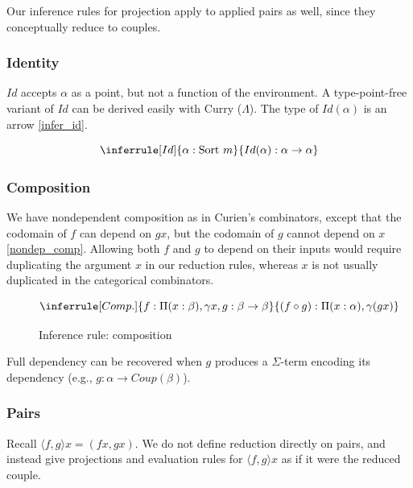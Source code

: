 \documentclass{article}
\newcommand{\sort}[1]{\text{Sort}\ #1}
\begin{document}
Our inference rules for projection apply to applied pairs as well, since they conceptually reduce to couples.

\subsubsection{Identity}

\(Id\) accepts \(\alpha\) as a point, but not a function of the environment. A type-point-free variant of \(Id\) can be derived easily with Curry (\(\Lambda\)). The type of \(Id(\alpha)\) is an arrow \eqref{infer_id}.

\begin{equation}\label{infer_id}
  \inferrule[Id]
  {\alpha : \sort{m}}
  {Id(\alpha) : \alpha \rightarrow \alpha}
\end{equation}

\subsubsection{Composition}

We have nondependent composition as in Curien's combinators, except that the codomain of \(f\) can depend on \(g x\), but the codomain of \(g\) cannot depend on \(x\) \eqref{nondep_comp}. Allowing both \(f\) and \(g\) to depend on their inputs would require duplicating the argument \(x\) in our reduction rules, whereas \(x\) is not usually duplicated in the categorical combinators.

\begin{figure}[h!]
  \centering
  \begin{equation}\label{nondep_comp}
    \inferrule[Comp.]
    { f : \Pi (x : \beta), \gamma x, g : \beta \rightarrow \beta}
    { (f \circ g) : \Pi (x : \alpha), \gamma (g x)}
  \end{equation}
  \caption{Inference rule: composition}
\end{figure}

Full dependency can be recovered when \(g\) produces a \(\Sigma\)-term encoding its dependency (e.g., \(g : \alpha \rightarrow Coup(\beta)\)).

\subsubsection{Pairs}

Recall \(\langle f, g \rangle x = (f x, g x)\). We do not define reduction directly on pairs, and instead give projections and evaluation rules for \(\langle f, g \rangle x\) as if it were the reduced couple.
\end{document}
